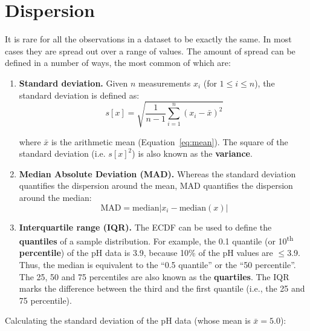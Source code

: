 \section{Dispersion}
\label{sec:dispersion}

It is rare for all the observations in a dataset to be exactly the
same. In most cases they are spread out over a range of values. The
amount of spread can be defined in a number of ways, the most common
of which are:

\begin{enumerate}

\item{\bf Standard deviation.} Given $n$ measurements $x_i$ (for $1
  \leq i \leq n$), the standard deviation is defined as:
\begin{equation}
  s[x] = \sqrt{\frac{1}{n-1}\sum\limits_{i=1}^{n}(x_i-\bar{x})^2}
  \label{eq:stdev}
\end{equation}

\noindent where $\bar{x}$ is the arithmetic mean
(Equation~\ref{eq:mean}). The square of the standard deviation
(i.e. $s[x]^2$) is also known as the \textbf{variance}.

\item{\bf Median Absolute Deviation (MAD).} Whereas the standard
  deviation quantifies the dispersion around the mean, MAD quantifies
  the dispersion around the median:
  \begin{equation}
    \mbox{MAD} = \mbox{median}|x_i - \mbox{median}(x)|
    \label{eq:MAD}
  \end{equation}
  
\item{\bf Interquartile range (IQR).} The ECDF can be used to define
  the \textbf{quantiles} of a sample distribution. For example, the
  0.1 quantile (or 10\textsuperscript{th} \textbf{percentile}) of the
  pH data is 3.9, because 10\% of the pH values are $\leq$3.9. Thus,
  the median is equivalent to the ``0.5 quantile'' or the ``50
  percentile''. The 25, 50 and 75 percentiles are also known as the
  \textbf{quartiles}. The IQR marks the difference between the third
  and the first quantile (i.e., the 25 and 75 percentile).
  
\end{enumerate}

Calculating the standard deviation of the pH data (whose mean is
$\bar{x} = 5.0$):

